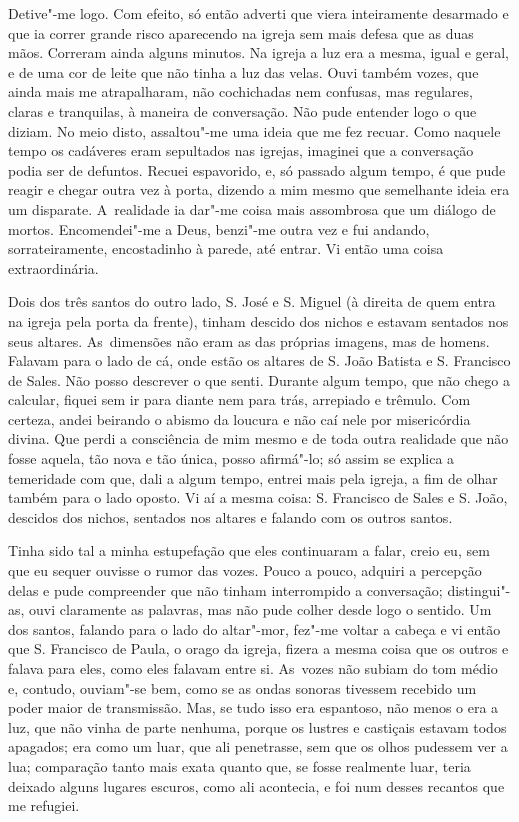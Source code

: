 Detive"-me logo. Com efeito, só então adverti que viera inteiramente
desarmado e que ia correr grande risco aparecendo na igreja sem mais
defesa que as duas mãos. Correram ainda alguns minutos. Na igreja a luz
era a mesma, igual e geral, e de uma cor de leite que não tinha a luz
das velas. Ouvi também vozes, que ainda mais me atrapalharam, não
cochichadas nem confusas, mas regulares, claras e tranquilas, à maneira
de conversação. Não pude entender logo o que diziam. No meio disto,
assaltou"-me uma ideia que me fez recuar. Como naquele tempo os cadáveres
eram sepultados nas igrejas, imaginei que a conversação podia ser de
defuntos. Recuei espavorido, e, só passado algum tempo, é que pude
reagir e chegar outra vez à porta, dizendo a mim mesmo que semelhante
ideia era um disparate. A~realidade ia dar"-me coisa mais assombrosa que
um diálogo de mortos. Encomendei"-me a Deus, benzi"-me outra vez e fui
andando, sorrateiramente, encostadinho à parede, até entrar. Vi então
uma coisa extraordinária.

Dois dos três santos do outro lado, S. José e S. Miguel (à direita de
quem entra na igreja pela porta da frente), tinham descido dos nichos e
estavam sentados nos seus altares. As~dimensões não eram as das próprias
imagens, mas de homens. Falavam para o lado de cá, onde estão os altares
de S. João Batista e S. Francisco de Sales. Não posso descrever o que
senti. Durante algum tempo, que não chego a calcular, fiquei sem ir para
diante nem para trás, arrepiado e trêmulo. Com certeza, andei beirando o
abismo da loucura e não caí nele por misericórdia divina. Que perdi a
consciência de mim mesmo e de toda outra realidade que não fosse aquela,
tão nova e tão única, posso afirmá"-lo; só assim se explica a temeridade
com que, dali a algum tempo, entrei mais pela igreja, a fim de olhar
também para o lado oposto. Vi aí a mesma coisa: S. Francisco de Sales e
S. João, descidos dos nichos, sentados nos altares e falando com os
outros santos.

Tinha sido tal a minha estupefação que eles continuaram a falar, creio
eu, sem que eu sequer ouvisse o rumor das vozes. Pouco a pouco, adquiri
a percepção delas e pude compreender que não tinham interrompido a
conversação; distingui"-as, ouvi claramente as palavras, mas não pude
colher desde logo o sentido. Um dos santos, falando para o lado do
altar"-mor, fez"-me voltar a cabeça e vi então que S. Francisco de Paula,
o orago da igreja, fizera a mesma coisa que os outros e falava para
eles, como eles falavam entre si. As~vozes não subiam do tom médio e,
contudo, ouviam"-se bem, como se as ondas sonoras tivessem recebido um
poder maior de transmissão. Mas, se tudo isso era espantoso, não menos o
era a luz, que não vinha de parte nenhuma, porque os lustres e castiçais
estavam todos apagados; era como um luar, que ali penetrasse, sem que os
olhos pudessem ver a lua; comparação tanto mais exata quanto que, se
fosse realmente luar, teria deixado alguns lugares escuros, como ali
acontecia, e foi num desses recantos que me refugiei.

